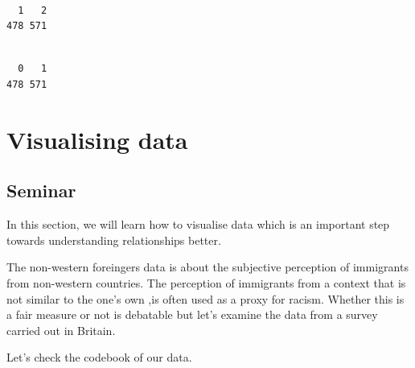 \documentclass[]{article}
\newenvironment{Shaded}{\begin{snugshade}}{\end{snugshade}}
\newcommand{\KeywordTok}[1]{\textcolor[rgb]{0.13,0.29,0.53}{\textbf{#1}}}
\newcommand{\NormalTok}[1]{#1}
\newcommand{\OperatorTok}[1]{\textcolor[rgb]{0.81,0.36,0.00}{\textbf{#1}}}
\begin{document}
\begin{verbatim}

  1   2 
478 571 
\end{verbatim}

\begin{Shaded}
\end{Shaded}

\begin{verbatim}

  0   1 
478 571 
\end{verbatim}

\hypertarget{visualising-data}{%
\section{Visualising data}\label{visualising-data}}

\hypertarget{seminar-5}{%
\subsection{Seminar}\label{seminar-5}}

In this section, we will learn how to visualise data which is an important step towards understanding relationships better.

The non-western foreingers data is about the subjective perception of immigrants from non-western countries. The perception of immigrants from a context that is not similar to the one's own ,is often used as a proxy for racism. Whether this is a fair measure or not is debatable but let's examine the data from a survey carried out in Britain.

Let's check the codebook of our data.
\end{document}
